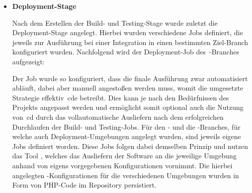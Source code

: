 \begin{itemize}
    \item {
        \textbf{Deployment-Stage}\par
        Nach dem Erstellen der Build- und Testing-Stage wurde zuletzt die Deployment-Stage angelegt.
        Hierbei wurden verschiedene Jobs definiert, die jeweils zur Ausführung bei einer Integration in einen
        bestimmten Ziel-Branch konfiguriert wurden.
        Nachfolgend wird der Deployment-Job des\ -Branches aufgezeigt:

        \vspace{-2.3em}

        Der Job wurde so konfiguriert, dass die finale Ausführung zwar automatisiert abläuft, dabei aber manuell
        angestoßen werden muss, womit die umgesetzte Strategie effektiv\ \acrlong{cde} betreibt.
        Dies kann je nach den Bedürfnissen des Projekts angepasst werden und ermöglicht somit optional auch die
        Nutzung von\ \acrshort{cd} durch das vollautomatische Ausliefern nach dem erfolgreichen Durchlaufen der Build-
        und Testing-Jobs.
        Für den - und die -Branches, für welche auch
        Deployment-Umgebungen angelegt wurden, sind jeweils eigene Jobs definiert worden.
        Diese Jobs folgen dabei demselben Prinzip und nutzen das Tool , welches das Ausliefern
        der Software an die jeweilige Umgebung anhand von eigens vorgegebenen Konfigurationen vornimmt.
        Die hierbei angelegten -Konfigurationen für die verschiedenen Umgebungen wurden in Form
        von PHP-Code im Repository persistiert.
    }
\end{itemize}

